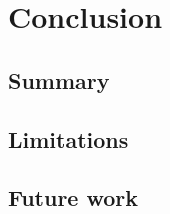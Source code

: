 \chapter{Conclusion}
\label{chap:conclusion}

\section{Summary}
\label{sec:concl:summary}


\section{Limitations}
\label{sec:concl:limits}


\section{Future work}
\label{sec:concl:future}

